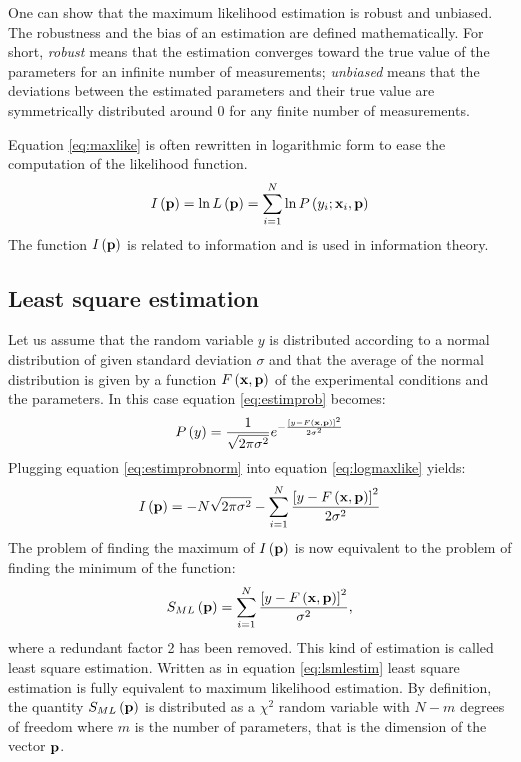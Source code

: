 \documentclass[twoside]{book}
\begin{document}
One can show that the maximum likelihood estimation is robust and
unbiased. The robustness and the bias of an estimation are defined
mathematically. For short, {\sl robust} means that the estimation
converges toward the true value of the parameters for an infinite
number of measurements; {\sl unbiased} means that the deviations
between the estimated parameters and their true value are
symmetrically distributed around 0 for any finite number of
measurements.

Equation \ref{eq:maxlike} is often rewritten in logarithmic form
to ease the computation of the likelihood function.
\begin{equation}
\label{eq:logmaxlike}
  I\left({\bf p}\right)=\ln L\left({\bf p}\right)=\sum_{i=1}^N\ln P\left(y_i;{\bf x}_i,{\bf p}\right)
\end{equation}
The function $I\left({\bf p}\right)$ is related to information and
is used in information theory.

\subsection{Least square estimation}
Let us assume that the random variable $y$ is distributed
according to a normal distribution of given standard deviation
$\sigma$ and that the average of the normal distribution is given
by a function $F\left({\bf x},{\bf p}\right)$ of the experimental
conditions and the parameters. In this case equation
\ref{eq:estimprob} becomes:
\begin{equation}
\label{eq:estimprobnorm}
  P\left(y\right)={1\over\sqrt{2\pi\sigma^2}}e^{-{
  \left[y-F\left({\bf x},{\bf p}\right)\right]^2\over 2\sigma^2}}
\end{equation}
Plugging equation \ref{eq:estimprobnorm} into equation
\ref{eq:logmaxlike} yields:
\begin{equation}
  I\left({\bf p}\right)=-N\sqrt{2\pi\sigma^2}-
  \sum_{i=1}^N {
  \left[y-F\left({\bf x},{\bf p}\right)\right]^2\over 2\sigma^2}
\end{equation}
The problem of finding the maximum of $I\left({\bf p}\right)$ is
now equivalent to the problem of finding the minimum of the
function:
\begin{equation}
\label{eq:lsmlestim}
  S_{\mathop{ML}}\left({\bf p}\right)=\sum_{i=1}^N {
  \left[y-F\left({\bf x},{\bf p}\right)\right]^2\over \sigma^2},
\end{equation}
where a redundant factor 2 has been removed. This kind of
estimation is called least square estimation. Written as in
equation \ref{eq:lsmlestim} least square estimation is fully
equivalent to maximum likelihood estimation. By definition, the
quantity $S_{\mathop{ML}}\left({\bf p}\right)$ is distributed as a
$\chi^2$ random variable with $N-m$ degrees of freedom where $m$
is the number of parameters, that is the dimension of the vector
${\bf p}$.
\end{document}
